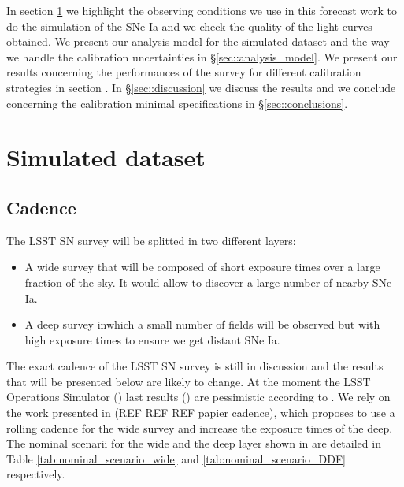 \documentclass[\docopts]{\docclass}
\begin{document}
In section \ref{sec::simulated_dataset} we highlight the observing conditions we use in this forecast work to do the simulation of the SNe Ia and we check the quality of the light curves obtained.
We present our analysis model for the simulated dataset and the way we handle the calibration uncertainties in §\ref{sec::analysis_model}.
We present our results concerning the performances of the survey for different calibration strategies in section .
In §\ref{sec::discussion} we discuss the results and we conclude concerning the calibration minimal specifications in §\ref{sec::conclusions}.





\section{Simulated dataset}
\label{sec::simulated_dataset}

\subsection{Cadence}
\label{subsec::cadence}

The LSST SN survey will be splitted in two different layers:
\begin{itemize}
\item A wide survey that will be composed of short exposure times over a large fraction of the sky.
  It would allow to discover a large number of nearby SNe Ia.
\item A deep survey inwhich a small number of fields will be observed but with high exposure times to ensure we get distant SNe Ia.
\end{itemize}
The exact cadence of the LSST SN survey is still in discussion and the results that will be presented below are likely to change.
At the moment the LSST Operations Simulator () last results () are pessimistic  according to \cite{SN-CADENCE}.
We rely on the work presented in (REF REF REF papier cadence), which proposes to use a rolling cadence for the wide survey and increase the exposure times of the deep. The nominal scenarii for the wide and the deep layer shown in \cite{SN-CADENCE} are detailed in Table \ref{tab:nominal_scenario_wide} and \ref{tab:nominal_scenario_DDF} respectively.
\end{document}
